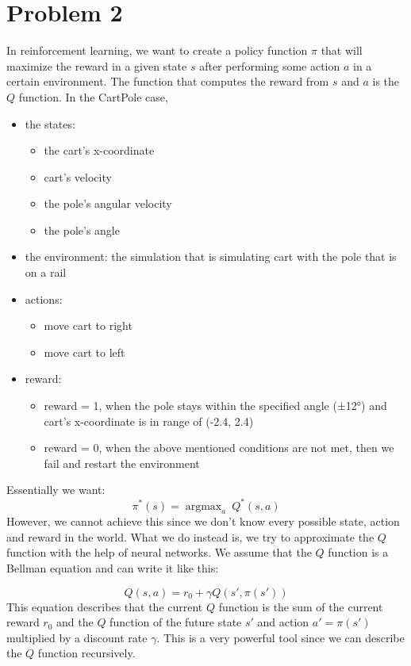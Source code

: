 \documentclass{article}
\numberwithin{equation}{section}
\DeclareMathOperator*{\argmax}{argmax} %
\numberwithin{equation}{section}
\begin{document}
\section{Problem 2}
In reinforcement learning, we want to create a policy function $\pi$ that will maximize the reward in a given state $s$ after performing some action $a$ in a certain environment. The function that computes the reward from $s$ and $a$ is the $Q$ function. In the CartPole case,
\begin{itemize}
\item the states: 
\begin{itemize}
\item the cart's x-coordinate
\item cart's velocity
\item the pole's angular velocity
\item the pole's angle
\end{itemize}
\item the environment: the simulation that is simulating cart with the pole that is on a rail
\item actions:
\begin{itemize}
\item move cart to right
\item move cart to left
\end{itemize} 
\item reward:
\begin{itemize}
\item reward = 1, when the pole stays within the specified angle (±12°) and cart's x-coordinate is in range of (-2.4, 2.4)
\item reward = 0, when the above mentioned conditions are not met, then we fail and restart the environment
\end{itemize} 
\end{itemize}  

Essentially we want:
$$
\pi^*(s) = \argmax_a \ Q^*(s,a)
$$
However, we cannot achieve this since we don't know every possible state, action and reward in the world. What we do instead is, we try to approximate the $Q$ function with the help of neural networks. We assume that the $Q$ function is a Bellman equation and can write it like this:

$$
Q(s,a) = r_0 + \gamma Q(s',\pi(s'))
$$
This equation describes that the current $Q$ function is the sum of the current reward $r_0$ and the $Q$ function of the future state $s'$ and action $a' = \pi(s')$ multiplied by a discount rate $\gamma$. This is a very powerful tool since we can describe the $Q$ function recursively.
\end{document}
